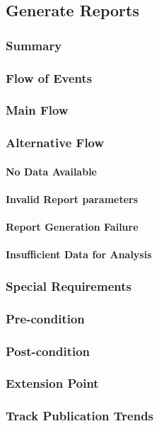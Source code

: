 \subsection{Generate Reports}
\subsubsection{Summary}

\subsubsection{Flow of Events}
\subsubsection*{Main Flow}

\subsubsection*{Alternative Flow}
\paragraph{No Data Available}

\paragraph{Invalid Report parameters}

\paragraph{Report Generation Failure}

\paragraph{Insufficient Data for Analysis}

\subsubsection{Special Requirements}

\subsubsection{Pre-condition}

\subsubsection{Post-condition}

\subsubsection{Extension Point}
\subsubsection*{Track Publication Trends}

